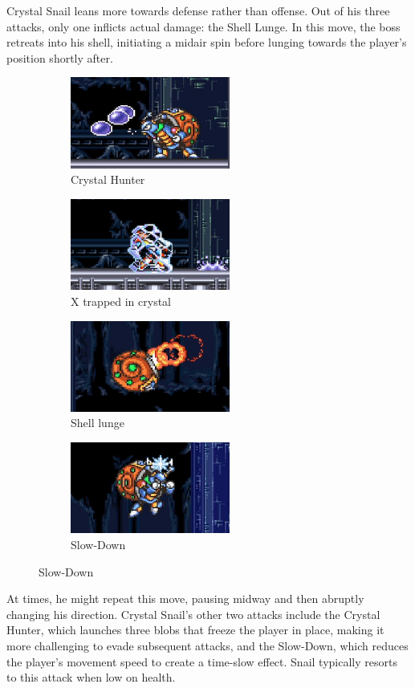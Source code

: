 Crystal Snail leans more towards defense rather than offense. Out of his three attacks, only one inflicts actual damage: the Shell Lunge. In this move, the boss retreats into his shell, initiating a midair spin before lunging towards the player's position shortly after. \begin{figure}[htp]
	\centering
	\begin{subfigure}{0.45\linewidth}
		\centering
		\includegraphics[height=3cm]{figures/X2/Crystal_snail/Crystal_hunter.png}
		\caption{Crystal Hunter}
	\end{subfigure}
	\begin{subfigure}{0.45\linewidth}
		\centering
		\includegraphics[height=3cm]{figures/X2/Crystal_snail/Crystal_trapped_X.png}
		\caption{X trapped in crystal}
	\end{subfigure}
	\begin{subfigure}{0.45\linewidth}
		\centering
		\includegraphics[height=3cm]{figures/X2/Crystal_snail/Crystal_shell_jet.png}
		\caption{Shell lunge}
	\end{subfigure}
	\begin{subfigure}{0.45\linewidth}
		\centering
		\includegraphics[height=3cm]{figures/X2/Crystal_snail/Crystal_DM.png}
		\caption{Slow-Down}
	\end{subfigure}
\end{figure}
At times, he might repeat this move, pausing midway and then abruptly changing his direction. Crystal Snail's other two attacks include the Crystal Hunter, which launches three blobs that freeze the player in place, making it more challenging to evade subsequent attacks, and the Slow-Down, which reduces the player's movement speed to create a time-slow effect. Snail typically resorts to this attack when low on health.

